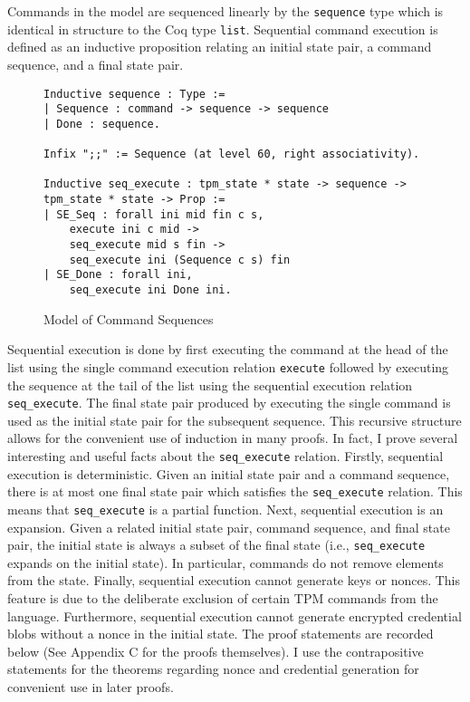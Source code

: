 Commands in the model are sequenced linearly by the \verb|sequence| type which is identical in structure to the Coq type \verb|list|. Sequential command execution is defined as an inductive proposition relating an initial state pair, a command sequence, and a final state pair. 
\begin{figure}[h]
\begin{lstlisting}[language=Coq]
Inductive sequence : Type :=
| Sequence : command -> sequence -> sequence
| Done : sequence.

Infix ";;" := Sequence (at level 60, right associativity).

Inductive seq_execute : tpm_state * state -> sequence -> tpm_state * state -> Prop :=
| SE_Seq : forall ini mid fin c s,
    execute ini c mid ->
    seq_execute mid s fin ->
    seq_execute ini (Sequence c s) fin
| SE_Done : forall ini,
    seq_execute ini Done ini.
\end{lstlisting}
\caption{Model of Command Sequences}
\end{figure}
Sequential execution is done by first executing the command at the head of the list using the single command execution relation \verb|execute| followed by executing the sequence at the tail of the list using the sequential execution relation \verb|seq_execute|. The final state pair produced by executing the single command is used as the initial state pair for the subsequent sequence. This recursive structure allows for the convenient use of induction in many proofs.
In fact, I prove several interesting and useful facts about the \verb|seq_execute| relation. Firstly, sequential execution is deterministic. Given an initial state pair and a command sequence, there is at most one final state pair which satisfies the \verb|seq_execute| relation. This means that \verb|seq_execute| is a partial function. Next, sequential execution is an expansion. Given a related initial state pair, command sequence, and final state pair, the initial state is always a subset of the final state (i.e., \verb|seq_execute| expands on the initial state). In particular, commands do not remove elements from the state. Finally, sequential execution cannot generate keys or nonces. This feature is due to the deliberate exclusion of certain TPM commands from the language. Furthermore, sequential execution cannot generate encrypted credential blobs without a nonce in the initial state. The proof statements are recorded below (See Appendix C for the proofs themselves). I use the contrapositive statements for the theorems regarding nonce and credential generation for convenient use in later proofs. 
